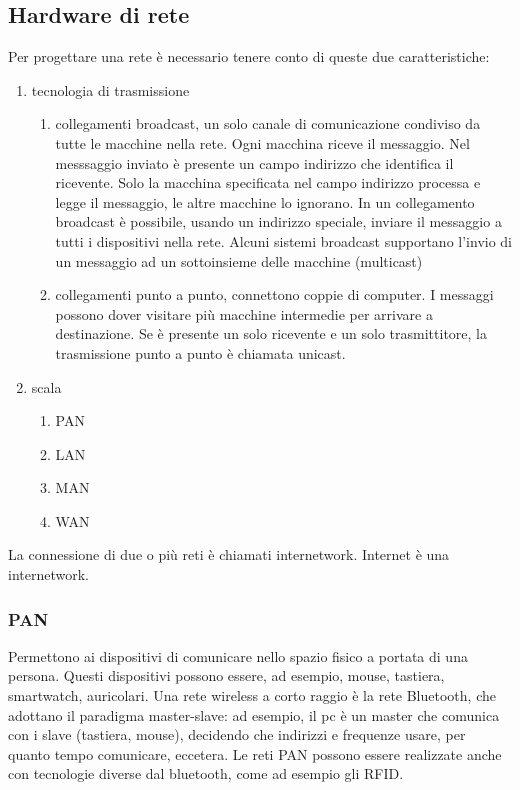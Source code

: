 \documentclass{article}
\begin{document}
		\subsection{Hardware di rete}
		Per progettare una rete è necessario tenere conto di queste due caratteristiche:
		\begin{enumerate}	  
			\item tecnologia di trasmissione
			\begin{enumerate}
				\item collegamenti broadcast, un solo canale di comunicazione condiviso da tutte le macchine nella rete. Ogni macchina riceve il messaggio. Nel messsaggio inviato è presente un campo indirizzo che identifica il ricevente.
				Solo la macchina specificata nel campo indirizzo processa e legge il messaggio, le altre macchine lo ignorano.
				In un collegamento broadcast è possibile, usando un indirizzo speciale, inviare il messaggio a tutti i dispositivi nella rete. Alcuni sistemi broadcast supportano l'invio di un messaggio ad un sottoinsieme delle macchine (multicast)
				\item collegamenti punto a punto, connettono coppie di computer. I messaggi possono dover visitare più macchine intermedie per arrivare a destinazione. Se è presente un solo ricevente e un solo trasmittitore, la trasmissione punto a punto è chiamata unicast.
			\end{enumerate}
			\item scala
			\begin{enumerate}
				\item PAN
				\item LAN
				\item MAN
				\item WAN
			\end{enumerate}
		\end{enumerate}
		La connessione di due o più reti è chiamati internetwork. Internet è una internetwork.
			\subsubsection{PAN}
				Permettono ai dispositivi di comunicare nello spazio fisico a portata di una persona. Questi dispositivi possono essere, ad esempio, mouse, tastiera, smartwatch, auricolari. Una rete wireless a corto raggio è la rete Bluetooth, che adottano il paradigma master-slave: ad esempio, il pc è un master che comunica con i slave (tastiera, mouse), decidendo che indirizzi e frequenze usare, per quanto tempo comunicare, eccetera.
				Le reti PAN possono essere realizzate anche con tecnologie diverse dal bluetooth, come ad esempio gli RFID.
\end{document}
